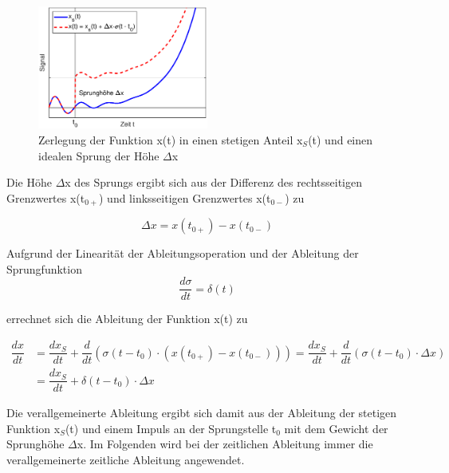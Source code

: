 \begin{figure}[ht]
  \centerline{\includegraphics[width=0.5\textwidth]{Kapitel1/Bilder/image19}}
  \caption{Zerlegung der Funktion x(t) in einen stetigen Anteil x${}_{S}$(t) und einen idealen Sprung der H\"{o}he $\Delta$x}
  \label{fig:DifferenzierenErweitert}
\end{figure}
\noindent Die H\"{o}he $\Delta$x des Sprungs ergibt sich aus der Differenz des rechtsseitigen Grenzwertes x(t${}_{0+}$) und linksseitigen Grenzwertes x(t${}_{0-}$) zu 

\begin{equation}\label{eq:onefiftyeight}
\Delta x=x\left(t_{0+} \right)-x\left(t_{0-} \right)
\end{equation}


\noindent Aufgrund der Linearit\"{a}t der Ableitungsoperation und der Ableitung der Sprungfunktion 
\begin{equation}\label{eq:onefiftynine}
\dfrac{d\sigma }{dt} =\delta \left(t\right)
\end{equation}

\noindent errechnet sich die Ableitung der Funktion x(t) zu

\begin{equation}\label{eq:onesixty}
\begin{split}
 \dfrac{dx}{dt}  & =  \dfrac{dx_{S}}{dt} +\dfrac{d}{dt} \left(\sigma \left(t-t_{0} \right)\cdot \left(x\left(t_{0+} \right)-x\left(t_{0-} \right)\right)\right) = \dfrac{dx_{S} }{dt} +\dfrac{d}{dt} \left(\sigma \left(t-t_{0} \right)\cdot \Delta x\right) \\
 & = \dfrac{dx_{S} }{dt} +\delta \left(t-t_{0} \right)\cdot \Delta x 
\end{split}
\end{equation}


\noindent Die verallgemeinerte Ableitung ergibt sich damit aus der Ableitung der stetigen Funktion x${}_{S}$(t) und einem Impuls an der Sprungstelle t${}_{0}$ mit dem Gewicht der Sprungh\"{o}he $\Delta$x. Im Folgenden wird bei der zeitlichen Ableitung immer die verallgemeinerte zeitliche Ableitung angewendet. \clearpage

